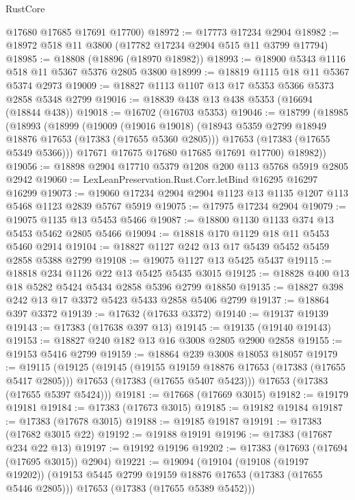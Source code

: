 \begin{lexlean}{RustCore}
\begin{coremodule}
      @17680
      @17685
      @17691
      @17700)
@18972 := @17773 @17234 @2904
@18982 := @18972 @518 @11 @3800 (@17782 @17234 @2904 @515 @11 @3799 @17794)
@18985 := @18808 (@18896 (@18970 @18982))
@18993 := @18900 @5343 @1116 @518 @11 @5367 @5376 @2805 @3800
@18999 := @18819 @1115 @18 @11 @5367 @5374 @2973
@19009 := @18827 @1113 @1107 @13 @17 @5353 @5366 @5373 @2858 @5348 @2799
@19016 := @18839 @438 @13 @438 @5353 (@16694 (@18844 @438))
@19018 := @16702 (@16703 @5353)
@19046 := @18799
    (@18985
      (@18993
        (@18999
          (@19009
            (@19016 @19018)
            (@18943 @5359 @2799 @18949 @18876 @17653 (@17383 (@17655 @5360 @2805)))
            @17653
            (@17383 (@17655 @5349 @5366)))
          @17671
          @17675
          @17680
          @17685
          @17691
          @17700)
        @18982))
@19056 := @18898 @2904 @17710 @5379 @1208 @200 @113 @5768 @5919 @2805 @2942
@19060 := LexLeanPreservation.Rust.Corr.letBind @16295 @16297 @16299
@19073 := @19060 @17234 @2904 @2904 @1123 @13 @1135 @1207 @113 @5468 @1123 @2839 @5767 @5919
@19075 := @17975 @17234 @2904
@19079 := @19075 @1135 @13 @5453 @5466
@19087 := @18800 @1130 @1133 @374 @13 @5453 @5462 @2805 @5466
@19094 := @18818 @170 @1129 @18 @11 @5453 @5460 @2914
@19104 := @18827 @1127 @242 @13 @17 @5439 @5452 @5459 @2858 @5388 @2799
@19108 := @19075 @1127 @13 @5425 @5437
@19115 := @18818 @234 @1126 @22 @13 @5425 @5435 @3015
@19125 := @18828 @400 @13 @18 @5282 @5424 @5434 @2858 @5396 @2799 @18850
@19135 := @18827 @398 @242 @13 @17 @3372 @5423 @5433 @2858 @5406 @2799
@19137 := @18864 @397 @3372
@19139 := @17632 (@17633 @3372)
@19140 := @19137 @19139
@19143 := @17383 (@17638 @397 @13)
@19145 := @19135 (@19140 @19143)
@19153 := @18827 @240 @182 @13 @16 @3008 @2805 @2900 @2858
@19155 := @19153 @5416 @2799
@19159 := @18864 @239 @3008 @18053 @18057
@19179 := @19115
    (@19125
      (@19145
        (@19155 @19159 @18876 @17653 (@17383 (@17655 @5417 @2805)))
        @17653
        (@17383 (@17655 @5407 @5423)))
      @17653
      (@17383 (@17655 @5397 @5424)))
@19181 := @17668 (@17669 @3015)
@19182 := @19179 @19181
@19184 := @17383 (@17673 @3015)
@19185 := @19182 @19184
@19187 := @17383 (@17678 @3015)
@19188 := @19185 @19187
@19191 := @17383 (@17682 @3015 @22)
@19192 := @19188 @19191
@19196 := @17383 (@17687 @234 @22 @13)
@19197 := @19192 @19196
@19202 := @17383 (@17693 (@17694 (@17695 @3015)) @2904)
@19221 := @19094
    (@19104
      (@19108 (@19197 @19202))
      (@19153 @5445 @2799 @19159 @18876 @17653 (@17383 (@17655 @5446 @2805)))
      @17653
      (@17383 (@17655 @5389 @5452)))

\end{coremodule}
\end{lexlean}
